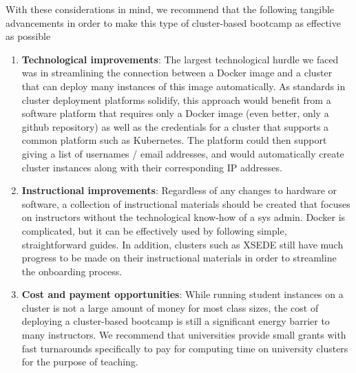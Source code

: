 With these considerations in mind, we recommend that the following tangible
advancements in order to make this type of cluster-based bootcamp as effective
as possible

\begin{enumerate}

\item {\bf Technological improvements}: The largest technological hurdle we
faced was in streamlining the connection between a Docker image and a
cluster that can deploy many instances of this image automatically. As
standards in cluster deployment platforms solidify, this approach would
benefit from a software platform that requires only a Docker image (even
better, only a github repository) as well as the credentials for a cluster
that supports a common platform such as Kubernetes. The platform could then
support giving a list of usernames / email addresses, and would automatically
create cluster instances along with their corresponding IP addresses.

\item {\bf Instructional improvements}: Regardless of any changes to hardware
or software, a collection of instructional materials should be created that
focuses on instructors without the technological know-how of a sys admin.
Docker is complicated, but it can be effectively used by following simple,
straightforward guides. In addition, clusters such as XSEDE still have
much progress to be made on their instructional materials in order to
streamline the onboarding process.

\item {\bf Cost and payment opportunities}: While running student instances
on a cluster is not a large amount of money for most class sizes, the cost
of deploying a cluster-based bootcamp is still a significant energy barrier
to many instructors. We recommend that universities provide small grants
with fast turnarounds specifically to pay for computing time on
university clusters for the purpose of teaching.

\end{enumerate}
